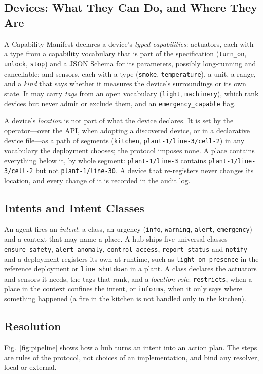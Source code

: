 \documentclass[conference]{IEEEtran}
\newcommand{\code}[1]{\texttt{#1}}
\begin{document}
\subsection{Devices: What They Can Do, and Where They Are}
A Capability Manifest declares a device's \emph{typed capabilities}: actuators, each with a type from a capability vocabulary that is part of the specification (\code{turn\_on}, \code{unlock}, \code{stop}) and a JSON Schema for its parameters, possibly long-running and cancellable; and sensors, each with a type (\code{smoke}, \code{temperature}), a unit, a range, and a \emph{kind} that says whether it measures the device's surroundings or its own state. It may carry \emph{tags} from an open vocabulary (\code{light}, \code{machinery}), which rank devices but never admit or exclude them, and an \code{emergency\_capable} flag.

A device's \emph{location} is not part of what the device declares. It is set by the operator---over the API, when adopting a discovered device, or in a declarative device file---as a path of segments (\code{kitchen}, \code{plant-1/line-3/cell-2}) in any vocabulary the deployment chooses; the protocol imposes none. A place contains everything below it, by whole segment: \code{plant-1/line-3} contains \code{plant-1/line-3/cell-2} but not \code{plant-1/line-30}. A device that re-registers never changes its location, and every change of it is recorded in the audit log.

\subsection{Intents and Intent Classes}
An agent fires an \emph{intent}: a class, an urgency (\code{info}, \code{warning}, \code{alert}, \code{emergency}) and a context that may name a place. A hub ships five universal classes---\code{ensure\_safety}, \code{alert\_anomaly}, \code{control\_access}, \code{report\_status} and \code{notify}---and a deployment registers its own at runtime, such as \code{light\_on\_presence} in the reference deployment or \code{line\_shutdown} in a plant. A class declares the actuators and sensors it needs, the tags that rank, and a \emph{location role}: \code{restricts}, when a place in the context confines the intent, or \code{informs}, when it only says where something happened (a fire in the kitchen is not handled only in the kitchen).

\subsection{Resolution}
Fig.~\ref{fig:pipeline} shows how a hub turns an intent into an action plan. The steps are rules of the protocol, not choices of an implementation, and bind any resolver, local or external.
\end{document}
